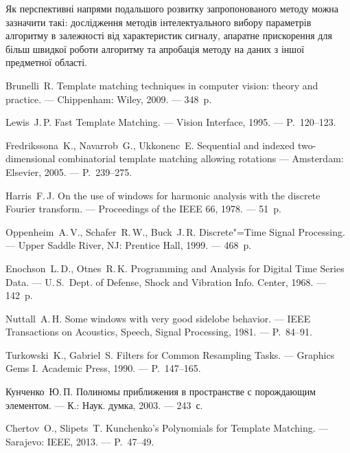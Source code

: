 \documentclass[pdftex]{thesis_utf8}
\begin{document}
Як перспективні напрями подальшого розвитку запропонованого методу можна зазначити такі: дослідження методів
інтелектуального вибору параметрів алгоритму в залежності від характеристик сигналу, апаратне прискорення для більш
швидкої роботи алгоритму та апробація методу на даних з іншої предметної області.

\begin{thebibliography}
    Brunelli~R. Template matching techniques in computer vision: theory and practice. --- Chippenham: Wiley, 2009. ---
    348~p.

    Lewis~J.\,P. Fast Template Matching. --- Vision Interface, 1995. --- P.~120--123.

    Fredrikssona~K., Navarrob~G., Ukkonenc~E. Sequential and indexed two-dimensional combinatorial template matching
    allowing rotations --- Amsterdam: Elsevier, 2005. --- P.~239--275.

    Harris~F.\,J. On the use of windows for harmonic analysis with the discrete Fourier transform. --- Proceedings of
    the IEEE 66, 1978. --- 51~p.

    Oppenheim~A.\,V., Schafer~R.\,W., Buck~J.\,R. Discrete"=Time Signal Processing. --- Upper Saddle River, NJ:
    Prentice Hall, 1999. --- 468~p.

    Enochson~L.\,D., Otnes~R.\,K. Programming and Analysis for Digital Time Series Data. --- U.\,S.~Dept. of Defense,
    Shock and Vibration Info. Center, 1968. --- 142~p.

    Nuttall~A.\,H. Some windows with very good sidelobe behavior. --- IEEE Transactions on Acoustics, Speech, Signal
    Processing, 1981. --- P.~84--91.

    Turkowski~K., Gabriel~S. Filters for Common Resampling Tasks. --- Graphics Gems I. Academic Press, 1990. ---
    P.~147--165.

    Кунченко~Ю.\,П. Полиномы приближения в пространстве с порождающим элементом. --- К.: Наук. думка, 2003. --- 243~с.

    Chertov~O., Slipets~T. Kunchenko's Polynomials for Template Matching. --- Sarajevo: IEEE, 2013. --- P.~47--49.


\end{thebibliography}
\end{document}
